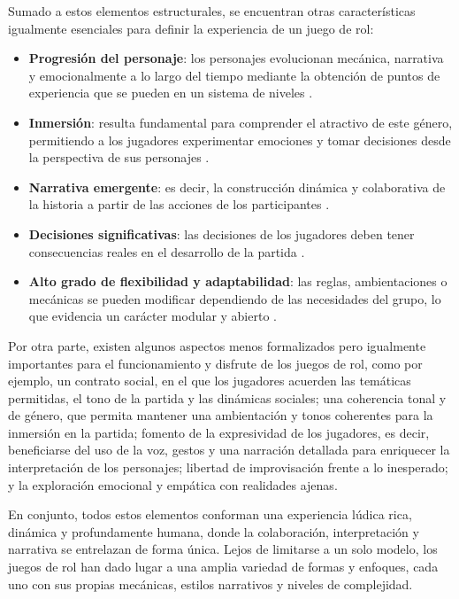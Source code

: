 \medskip

Sumado a estos elementos estructurales, se encuentran otras características igualmente esenciales para definir la experiencia de un juego de rol:
\begin{itemize}
	\item \textbf{Progresión del personaje}: los personajes evolucionan mecánica, narrativa y emocionalmente a lo largo del tiempo mediante la obtención de puntos de experiencia que se pueden  en un sistema de niveles \citep{barton2008dungeons}.
	\item \textbf{Inmersión}: resulta fundamental para comprender el atractivo de este género, permitiendo a los jugadores experimentar emociones y tomar decisiones desde la perspectiva de sus personajes \citep{Montola2010}.
	\item \textbf{Narrativa emergente}: es decir, la construcción dinámica y colaborativa de la historia a partir de las acciones de los participantes \citep{FineRPG}.
 	\item \textbf{Decisiones significativas}: las decisiones de los jugadores deben tener consecuencias reales en el desarrollo de la partida \citep{tekinbas2003rules}.
	\item \textbf{Alto grado de flexibilidad y adaptabilidad}: las reglas, ambientaciones o mecánicas se pueden modificar dependiendo de las necesidades del grupo, lo que evidencia un carácter modular y abierto \citep{Edwards2001}.
\end{itemize} 

\medskip

Por otra parte, existen algunos aspectos menos formalizados pero igualmente importantes para el funcionamiento y disfrute de los juegos de rol, como por ejemplo, un contrato social, en el que los jugadores acuerden las temáticas permitidas, el tono de la partida y las dinámicas sociales; una coherencia tonal y de género, que permita mantener una ambientación y tonos coherentes para la inmersión en la partida; fomento de la expresividad de los jugadores, es decir, beneficiarse del uso de la voz, gestos y una narración detallada para enriquecer la interpretación de los personajes; libertad de improvisación frente a lo inesperado; y la exploración emocional y empática con realidades ajenas.

\medskip

En conjunto, todos estos elementos conforman una experiencia lúdica rica, dinámica y profundamente humana, donde la colaboración, interpretación y narrativa se entrelazan de forma única. Lejos de limitarse a un solo modelo, los juegos de rol han dado lugar a una amplia variedad de formas y enfoques, cada uno con sus propias mecánicas, estilos narrativos y niveles de complejidad.


